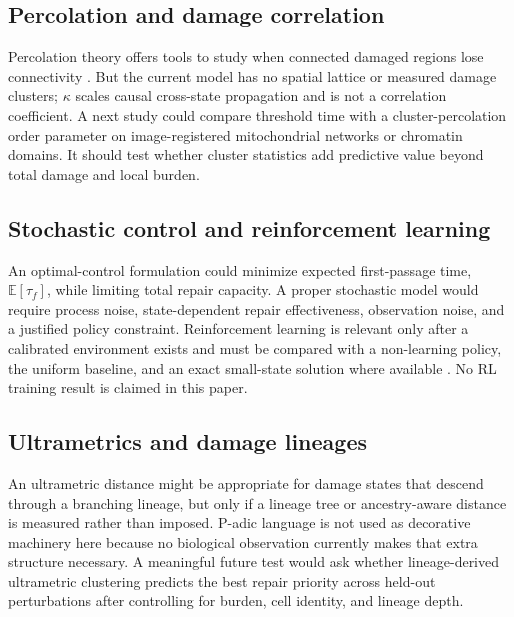\documentclass[10pt,letterpaper]{article}
\begin{document}
\subsection{Percolation and damage correlation}
Percolation theory offers tools to study when connected damaged regions lose connectivity \cite{StaufferAharony1994Percolation}. But the current model has no spatial lattice or measured damage clusters; $\kappa$ scales causal cross-state propagation and is not a correlation coefficient. A next study could compare threshold time with a cluster-percolation order parameter on image-registered mitochondrial networks or chromatin domains. It should test whether cluster statistics add predictive value beyond total damage and local burden.

\subsection{Stochastic control and reinforcement learning}
An optimal-control formulation could minimize expected first-passage time, $\mathbb{E}[\tau_f]$, while limiting total repair capacity. A proper stochastic model would require process noise, state-dependent repair effectiveness, observation noise, and a justified policy constraint. Reinforcement learning is relevant only after a calibrated environment exists and must be compared with a non-learning policy, the uniform baseline, and an exact small-state solution where available \cite{SuttonBarto2018RL}. No RL training result is claimed in this paper.

\subsection{Ultrametrics and damage lineages}
An ultrametric distance might be appropriate for damage states that descend through a branching lineage, but only if a lineage tree or ancestry-aware distance is measured rather than imposed. P-adic language is not used as decorative machinery here because no biological observation currently makes that extra structure necessary. A meaningful future test would ask whether lineage-derived ultrametric clustering predicts the best repair priority across held-out perturbations after controlling for burden, cell identity, and lineage depth.
\end{document}
